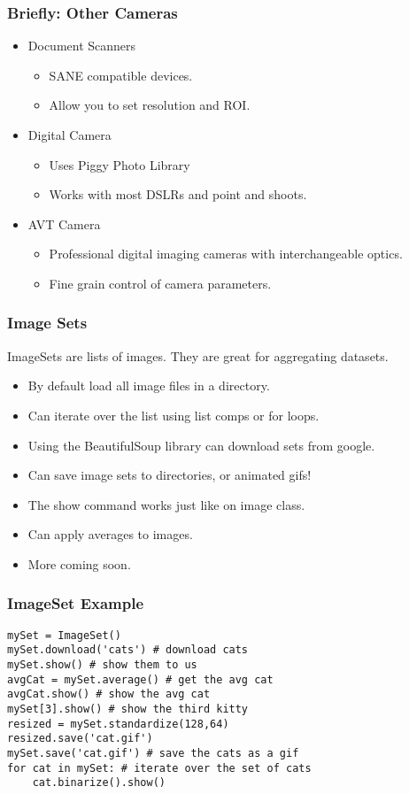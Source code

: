 \documentclass[compress]{beamer}
\begin{document}
\begin{frame}
\frametitle{Briefly: Other Cameras}
\begin{itemize}
\item Document Scanners
\begin{itemize}
\item SANE compatible devices.
\item Allow you to set resolution and ROI. 
\end{itemize}
\item Digital Camera
\begin{itemize}
\item Uses Piggy Photo Library
\item Works with most DSLRs and point and shoots.
\end{itemize}
\item AVT Camera
\begin{itemize}
\item Professional digital imaging cameras with interchangeable optics.
\item Fine grain control of camera parameters. 
\end{itemize}
\end{itemize}
\end{frame}
\begin{frame}
\frametitle{Image Sets}
ImageSets are lists of images. They are great for aggregating datasets.
\begin{itemize}
\item By default load all image files in a directory.
\item Can iterate over the list using list comps or for loops.
\item Using the BeautifulSoup library can download sets from google.
\item Can save image sets to directories, or animated gifs!
\item The show command works just like on image class.
\item Can apply averages to images.
\item More coming soon.
\end{itemize}
\end{frame}

\begin{frame}[fragile] 
\frametitle{ImageSet Example}
\begin{example}
\begin{verbatim}
mySet = ImageSet()
mySet.download('cats') # download cats
mySet.show() # show them to us
avgCat = mySet.average() # get the avg cat
avgCat.show() # show the avg cat
mySet[3].show() # show the third kitty
resized = mySet.standardize(128,64)
resized.save('cat.gif')
mySet.save('cat.gif') # save the cats as a gif
for cat in mySet: # iterate over the set of cats
    cat.binarize().show()
\end{verbatim}
\end{example}
\end{frame}
\end{document}
